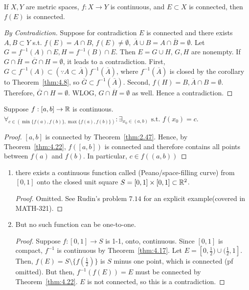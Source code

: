 \begin{theorem}[22]
	If $X,Y$ are metric spaces, $f:X\to Y$ is continuous, and $E \subset X$ is connected, then $f(E)$ is connected.
	\begin{proof}[By Contradiction]
		Suppose for contradiction $E$ is connected and there exists $A,B \subset Y$ s.t. $f(E)=A \cap  B$, $f(E) \neq \emptyset$, $\overline{A} \cup B=A \cap \overline{B}=\emptyset$.
		Let $G=f^{-1}(A) \cap E, H=f^{-1}(B)\cap E$. Then $E=G \cup H$, $G,H$ are nonempty.
		If $G \cap \overline{H}=\overline{G} \cap H=\emptyset$, it leads to a contradiction.
		First, $G \subset f^{-1}(A) \subset(\because A \subset \overline{A}) f^{-1}(\overline{A})$, where $f^{-1}(\overline{A})$ is closed by the corollary to Theorem~\ref{thm:4.8}, so $\overline{G} \subset f^{-1}(\overline{A})$.
		Second, $f(H)=B, \overline{A} \cap B=\emptyset$.
		Therefore, $\overline{G} \cap H =\emptyset$.
		WLOG, $G \cap \overline{H} = \emptyset$ as well.
		Hence a contradiction.
	\end{proof}
\end{theorem}

\begin{theorem}
	Suppose $f: [a,b]\to \mathbb{R}$ is continuous.  $\forall_{c \in (\min\{f(a),f(b)\}, \max\{f(a),f(b)\})}: \exists_{x_0 \in (a,b)} \text{ s.t. } f(x_0)=c$.
	\begin{proof}
		$[a,b]$ is connected by Theorem~\ref{thm:2.47}. Hence, by Theorem~\ref{thm:4.22}, $f([a,b])$ is connected and therefore contains all points between $f(a)$ and $f(b)$. In particular, $c \in f((a,b))$
	\end{proof}
\end{theorem}

\begin{example}
	\begin{enumerate}
		\item there exists a continuous function called (Peano/space-filling curve) from $[0,1]$ onto the closed unit square $S=[0,1]\times [0,1] \subset \mathbb{R}^2$.
		      \begin{proof}
			      Omitted. See Rudin's problem $7.14$ for an explicit example(covered in MATH-321).
		      \end{proof}
		\item But no such function can be one-to-one.
		      \begin{proof}
			      Suppose $f:[0,1]\to S$ is 1-1, onto, continuous. Since $[0,1]$ is compact, $f^{-1}$ is continuous by Theorem~\ref{thm:4.17}.
			      Let $E=[0,\frac{1}{2})\cup (\frac{1}{2},1]$. Then, $f(E)=S\setminus \{f(\frac{1}{2})\}$ is $S$ minus one point, which is connected (pf omitted).
			      But then, $f^{-1}(f(E))=E$ must be connected by Theorem~\ref{thm:4.22}. $E$ is not connected, so this is a contradiction.
		      \end{proof}
	\end{enumerate}
\end{example}

